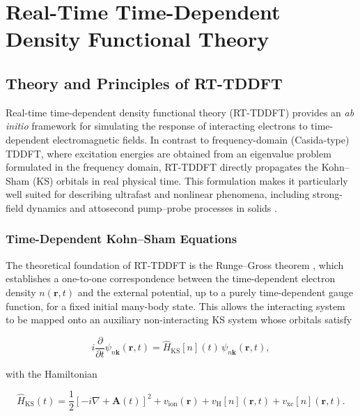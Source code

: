 \chapter{Real-Time Time-Dependent Density Functional Theory}
\label{chap:tddft}

\section{Theory and Principles of RT-TDDFT}

Real-time time-dependent density functional theory (RT-TDDFT) provides an \textit{ab initio} framework for simulating the response of interacting electrons to time-dependent electromagnetic fields. In contrast to frequency-domain (Casida-type) TDDFT, where excitation energies are obtained from an eigenvalue problem formulated in the frequency domain, RT-TDDFT directly propagates the Kohn--Sham (KS) orbitals in real physical time. This formulation makes it particularly well suited for describing ultrafast and nonlinear phenomena, including strong-field dynamics and attosecond pump--probe processes in solids \cite{RungeGross1984,Yabana2012,Sato2025review}.

\subsection{Time-Dependent Kohn--Sham Equations}

The theoretical foundation of RT-TDDFT is the Runge--Gross theorem \cite{RungeGross1984}, which establishes a one-to-one correspondence between the time-dependent electron density $n(\mathbf r,t)$ and the external potential, up to a purely time-dependent gauge function, for a fixed initial many-body state. This allows the interacting system to be mapped onto an auxiliary non-interacting KS system whose orbitals satisfy

\begin{equation}
  i\frac{\partial}{\partial t}\psi_{n\mathbf{k}}(\mathbf r,t)
  = \hat{H}_{\mathrm{KS}}[n](t)\,\psi_{n\mathbf{k}}(\mathbf r,t),
  \label{eq:TDKS}
\end{equation}

with the Hamiltonian

\begin{equation}
  \hat{H}_{\mathrm{KS}}(t)
  = \frac{1}{2}\left[-i\nabla + \mathbf A(t)\right]^2
    + v_{\mathrm{ion}}(\mathbf r)
    + v_{\mathrm{H}}[n](\mathbf r,t)
    + v_{\mathrm{xc}}[n](\mathbf r,t).
\end{equation}

